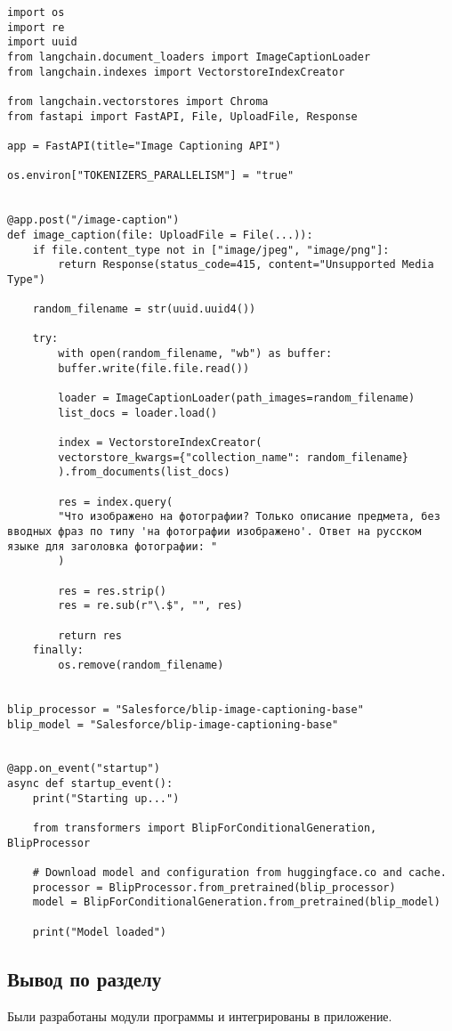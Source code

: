 \begin{lstlisting}[caption={Реализация бесконечной ленты}, label=lst:generation]
import os
import re
import uuid
from langchain.document_loaders import ImageCaptionLoader
from langchain.indexes import VectorstoreIndexCreator

from langchain.vectorstores import Chroma
from fastapi import FastAPI, File, UploadFile, Response

app = FastAPI(title="Image Captioning API")

os.environ["TOKENIZERS_PARALLELISM"] = "true"


@app.post("/image-caption")
def image_caption(file: UploadFile = File(...)):
	if file.content_type not in ["image/jpeg", "image/png"]:
		return Response(status_code=415, content="Unsupported Media Type")

	random_filename = str(uuid.uuid4())

	try:
		with open(random_filename, "wb") as buffer:
		buffer.write(file.file.read())
		
		loader = ImageCaptionLoader(path_images=random_filename)
		list_docs = loader.load()
		
		index = VectorstoreIndexCreator(
		vectorstore_kwargs={"collection_name": random_filename}
		).from_documents(list_docs)
		
		res = index.query(
		"Что изображено на фотографии? Только описание предмета, без вводных фраз по типу 'на фотографии изображено'. Ответ на русском языке для заголовка фотографии: "
		)
		
		res = res.strip()
		res = re.sub(r"\.$", "", res)
		
		return res
	finally:
		os.remove(random_filename)
	
	
blip_processor = "Salesforce/blip-image-captioning-base"
blip_model = "Salesforce/blip-image-captioning-base"


@app.on_event("startup")
async def startup_event():
	print("Starting up...")
	
	from transformers import BlipForConditionalGeneration, BlipProcessor
	
	# Download model and configuration from huggingface.co and cache.
	processor = BlipProcessor.from_pretrained(blip_processor)
	model = BlipForConditionalGeneration.from_pretrained(blip_model)
	
	print("Model loaded")
\end{lstlisting}

\subsection*{Вывод по разделу}

Были разработаны модули программы и интегрированы в приложение.

